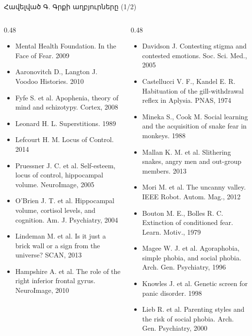 \begin{frame}{Հավելված Գ. Գրքի աղբյուրները (1/2)}
  \scriptsize
  \begin{columns}[T]
    \begin{column}{0.48\textwidth}
      \begin{itemize}\setlength{\itemsep}{0.2mm}
        \item Mental Health Foundation. In the Face of Fear. 2009
        \item Aaronovitch D., Langton J. Voodoo Histories. 2010
        \item Fyfe S. et al. Apophenia, theory of mind and schizotypy. Cortex, 2008
        \item Leonard H. L. Superstitions. 1989
        \item Lefcourt H. M. Locus of Control. 2014
        \item Pruessner J. C. et al. Self-esteem, locus of control, hippocampal volume. NeuroImage, 2005
        \item O'Brien J. T. et al. Hippocampal volume, cortisol levels, and cognition. Am. J. Psychiatry, 2004
        \item Lindeman M. et al. Is it just a brick wall or a sign from the universe? SCAN, 2013
        \item Hampshire A. et al. The role of the right inferior frontal gyrus. NeuroImage, 2010
      \end{itemize}
    \end{column}
    \begin{column}{0.48\textwidth}
      \begin{itemize}\setlength{\itemsep}{0.2mm}
        \item Davidson J. Contesting stigma and contested emotions. Soc. Sci. Med., 2005
        \item Castellucci V. F., Kandel E. R. Habituation of the gill-withdrawal reflex in Aplysia. PNAS, 1974
        \item Mineka S., Cook M. Social learning and the acquisition of snake fear in monkeys. 1988
        \item Mallan K. M. et al. Slithering snakes, angry men and out-group members. 2013
        \item Mori M. et al. The uncanny valley. IEEE Robot. Autom. Mag., 2012
        \item Bouton M. E., Bolles R. C. Extinction of conditioned fear. Learn. Motiv., 1979
        \item Magee W. J. et al. Agoraphobia, simple phobia, and social phobia. Arch. Gen. Psychiatry, 1996
        \item Knowles J. et al. Genetic screen for panic disorder. 1998
        \item Lieb R. et al. Parenting styles and the risk of social phobia. Arch. Gen. Psychiatry, 2000
      \end{itemize}
    \end{column}
  \end{columns}
\end{frame}

